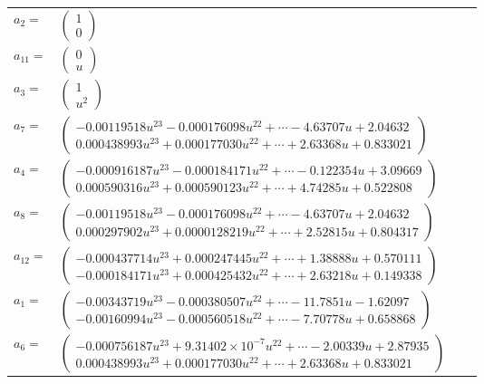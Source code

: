 \documentclass[1p]{elsarticle_modified}
\theoremstyle{definition}
\begin{document}
\begin{tabular}{m{7pt} m{180pt} m{7pt} m{180pt} }
\flushright $a_{2}=$&$\begin{pmatrix}1\\0\end{pmatrix}$ \\
\flushright $a_{11}=$&$\begin{pmatrix}0\\u\end{pmatrix}$ \\
\flushright $a_{3}=$&$\begin{pmatrix}1\\u^2\end{pmatrix}$ \\
\flushright $a_{7}=$&$\begin{pmatrix}-0.00119518 u^{23}-0.000176098 u^{22}+\cdots-4.63707 u+2.04632\\0.000438993 u^{23}+0.000177030 u^{22}+\cdots+2.63368 u+0.833021\end{pmatrix}$ \\
\flushright $a_{4}=$&$\begin{pmatrix}-0.000916187 u^{23}-0.000184171 u^{22}+\cdots-0.122354 u+3.09669\\0.000590316 u^{23}+0.000590123 u^{22}+\cdots+4.74285 u+0.522808\end{pmatrix}$ \\
\flushright $a_{8}=$&$\begin{pmatrix}-0.00119518 u^{23}-0.000176098 u^{22}+\cdots-4.63707 u+2.04632\\0.000297902 u^{23}+0.0000128219 u^{22}+\cdots+2.52815 u+0.804317\end{pmatrix}$ \\
\flushright $a_{12}=$&$\begin{pmatrix}-0.000437714 u^{23}+0.000247445 u^{22}+\cdots+1.38888 u+0.570111\\-0.000184171 u^{23}+0.000425432 u^{22}+\cdots+2.63218 u+0.149338\end{pmatrix}$ \\
\flushright $a_{1}=$&$\begin{pmatrix}-0.00343719 u^{23}-0.000380507 u^{22}+\cdots-11.7851 u-1.62097\\-0.00160994 u^{23}-0.000560518 u^{22}+\cdots-7.70778 u+0.658868\end{pmatrix}$ \\
\flushright $a_{6}=$&$\begin{pmatrix}-0.000756187 u^{23}+9.31402\times10^{-7} u^{22}+\cdots-2.00339 u+2.87935\\0.000438993 u^{23}+0.000177030 u^{22}+\cdots+2.63368 u+0.833021\end{pmatrix}$ \\

\end{tabular}
\end{document}

